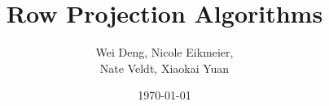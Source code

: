 \documentclass{beamer}
\title[]{Row Projection Algorithms} %
\author{Wei Deng,  Nicole Eikmeier, \\ Nate Veldt,  Xiaokai Yuan} %
\institute[UCLA] %
{
Purdue University \\ %
\medskip
}
\date{\today} %
\begin{document}
\begin{frame}
\titlepage %
\end{frame}








\end{document}

